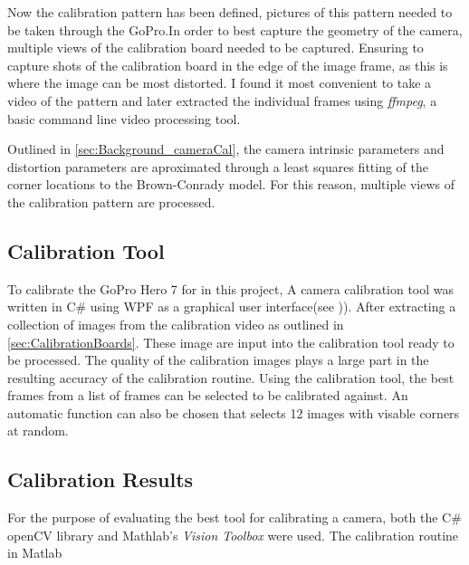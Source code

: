 \documentclass{UoNMCHA}
\numberwithin{equation}{section}
\begin{document}
Now the calibration pattern has been defined, pictures of this pattern needed to be taken through the GoPro.In order to best capture the geometry of the camera, multiple views of the calibration board needed to be captured. Ensuring to capture shots of the calibration board in the edge of the image frame, as this is where the image can be most distorted. I found it most convenient to take a video of the pattern and later extracted the individual frames using \textit{ffmpeg}, a basic command line video processing tool.

Outlined in \cref{sec:Background_cameraCal}, the camera intrinsic parameters and distortion parameters are aproximated through a least squares fitting of the corner locations to the Brown-Conrady model. For this reason, multiple views of the calibration pattern are processed.

\subsection{Calibration Tool}
To calibrate the GoPro Hero 7 for in this project, A camera calibration tool was written in C\# using WPF as a graphical user interface(see )). After extracting a collection of images from the calibration video as outlined in \cref{sec:CalibrationBoards}. These image are input into the calibration tool ready to be processed. The quality of the calibration images plays a large part in the resulting accuracy of the calibration routine. Using the calibration tool, the best frames from a list of frames can be selected to be calibrated against. An automatic function can also be chosen that selects 12 images with visable corners at random.

\subsection{Calibration Results}
For the purpose of evaluating the best tool for calibrating a camera, both the C\# openCV library and Mathlab's \textit{Vision Toolbox} were used. The calibration routine in Matlab
\end{document}
